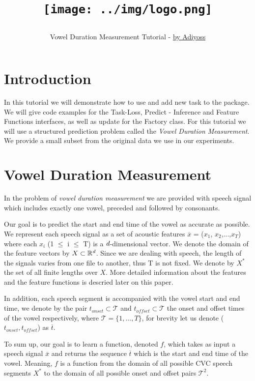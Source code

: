 \documentclass[11pt, oneside]{article}   	%
\title{\centerline{\texttt{[image: ../img/logo.png]}}}
\author{Vowel Duration Measurement Tutorial - \href{http://adiyoss.github.io/}{by Adiyoss}}
\begin{document}
\maketitle
\section{Introduction}
In this tutorial we will demonstrate how to use and add new task to the \stred package. We will give code examples for the Task-Loss, Predict - Inference and Feature Functions interfaces, as well as update for the Factory class. For this tutorial we will use a structured prediction problem called the \emph{Vowel Duration Measurement}. We provide a small subset from the original data we use in our experiments.

\section{Vowel Duration Measurement}
In the problem of \emph{vowel duration measurement} we are provided with speech signal which includes exactly one vowel, preceded and followed by consonants. 

Our goal is to predict the start and end time of the vowel as accurate as possible. We represent each speech signal as a set of acoustic features $\overline{x}$ = ($x_1$, $x_2$,...,$x_T$) where each $x_i$ (1 $\leq$ i $\leq$ T) is a $\emph{d}$-dimensional vector. We denote the domain of the feature vectors by $X \subset \mathbb{R}^\emph{d}$. Since we are dealing with speech, the length of the signals varies from one file to another, thus T is not fixed. We denote by $X^*$ the set of all finite lengths over $X$. More detailed information about the features and the feature functions is descried later on this paper. 

In addition, each speech segment is accompanied with the vowel start and end time, we denote by the pair $t_{onset}\subset \mathcal{T}$ and $t_{offset}\subset \mathcal{T}$ the onset and offset times of the vowel respectively, where $\mathcal{T} = \{1,...,T\}$, for brevity let us denote ($t_{onset}, t_{offset}$) as $\overline{t}$. 

To sum up, our goal is to learn a function, denoted $f$, which takes as input a speech signal $\overline{x}$ and returns the sequence $\overline{t}$ which is the start and end time of the vowel. Meaning, $f$ is a function from the domain of all possible CVC speech segments $X^*$ to the domain of all possible onset and offset pairs $\mathcal{T}^2$.
\end{document}

